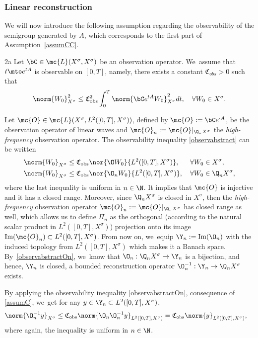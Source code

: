 \subsubsection{Linear reconstruction} We will now introduce the following assumption regarding the observability of the semigroup generated by $A$, which corresponds to the first part of Assumption~\ref{assumCC}.
\begin{assump}{2a}
\label{assumC}Let $\bC\in\mc{L}(X^\sigma, X^\sigma)$ be an observation operator. We~assume that $t\mto e^{tA}$ is observable on $[0,T]$, namely, there exists a constant $\mathfrak{C}_{obs}>0$ such that
\begin{align}\label{observabstract}
\norm{W_0}_{X^\sigma}^2\leq \mathfrak{C}_{\textup{obs}}^2\int_0^T \norm{\bC e^{tA}W_0}_{X^\sigma}^2dt,\quad \forall W_0\in X^\sigma.
\end{align}
\end{assump}
Let $\mc{O}\in \mc{L}(X^\sigma, L^2([0, T], X^\sigma))$, defined by $\mc{O}:=\bC e^{\cdot A}$, be the observation operator of linear waves and $\mc{O}_n:=\mc{O}|_{\Q_nX^\sigma}$ the \emph{high-frequency} observation operator. The observability inequality \eqref{observabstract} can be written
\begin{align}\label{observabstractO}
\norm{W_0}_{X^\sigma}&\leq \mathfrak{C}_{\textup{obs}}\nor{\O W_{0}}{L^{2}([0,T],X^\sigma)},\quad\;\; \forall W_0\in X^\sigma,\\
\label{observabstractOn} \norm{W_0}_{X^\sigma}&\leq \mathfrak{C}_{\textup{obs}}\nor{\O_{n} W_{0}}{L^{2}([0,T],X^\sigma)},\quad \forall W_0\in \Q_n X^\sigma,
\end{align}
where the last inequality is uniform in $n\in \N$.
It implies that $\mc{O}$ is injective and it has a closed range. Moreover, since $\Q_nX^\sigma$ is closed in $X^\sigma$, then the \emph{high-frequency} observation operator $\mc{O}_n:=\mc{O}|_{\Q_nX^\sigma}$ has closed range as well, which allows us to define $\Pi_n$ as the orthogonal (according to the natural scalar product in $L^2([0, T], X^\sigma)$) projection onto its image $\text{Im}(\mc{O}_n)\subset L^2([0, T], X^\sigma)$. From now on, we~equip $\Y_n:=\text{Im}(\O_n)$ with the induced topology from $L^2([0, T], X^\sigma)$ which makes it a Banach space. By~\eqref{observabstractOn}, we~know that $\O_n: \Q_n X^\sigma\to \Y_n$ is a bijection, and hence, $\Y_n$ is closed, a bounded reconstruction operator $\O_n^{-1}: \Y_n\to \Q_n X^\sigma$ exists.

By applying the observability inequality \eqref{observabstractOn}, consequence of \cref{assumC}, we~get for any $y\in \Y_n \subset L^2([0, T], X^\sigma)$,
\begin{align}
\label{boundOn-1}
\norm{\O_n^{-1}y}_{X^\sigma}&\leq \mathfrak{C}_{\textup{obs}}\norm{\O_{n}\O_n^{-1}y}_{L^2([0, T], X^\sigma)}=\mathfrak{C}_{\textup{obs}}\norm{y}_{L^2([0, T], X^\sigma)},
\end{align}
where again, the inequality is uniform in $n\in \N$.

